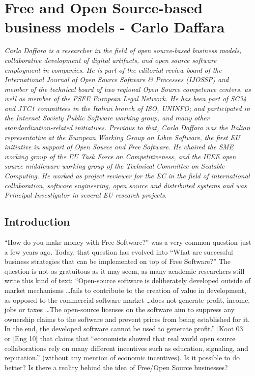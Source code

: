 \chapter{Free and Open Source-based business models - Carlo Daffara}

\textit{Carlo Daffara is a researcher in the field of open source-based business
models, collaborative development of digital artifacts, and open source software
employment in companies. He is part of the editorial review board of the
International Journal of Open Source Software \& Processes (IJOSSP) and member
of the technical board of two regional Open Source competence centers, as well
as member of the FSFE European Legal Network. He has been part of SC34 and JTC1
committees in the Italian branch of ISO, UNINFO; and participated in the
Internet Society Public Software working group, and many other
standardization-related initiatives. Previous to that, Carlo Daffara was the
Italian representative at the European Working Group on Libre Software, the
first EU initiative in support of Open Source and Free Software. He chaired the
SME working group of the EU Task Force on Competitiveness, and the IEEE open
source middleware working group of the Technical Committee on Scalable Computing. He worked as project reviewer for the EC in the field of international collaboration, software engineering, open source and distributed systems and was Principal Investigator in several EU research projects.}

\section*{Introduction}

``How do you make money with Free Software?'' was a very common question just a
few years ago. Today, that question has evolved into ``What are successful
business strategies that can be implemented on top of Free Software?'' The
question is not as gratuitous as it may seem, as many academic researchers still
write this kind of text: ``Open-source software is deliberately developed outside of market mechanisms \dots fails to contribute to the creation of value in development, as opposed to the commercial software market \dots does not generate profit, income, jobs or taxes \dots The open-source licenses on the software aim to suppress any ownership claims to the software and prevent prices from being established for it. In the end, the developed software cannot be used to generate profit.'' [Koot 03] or [Eng 10] that claims that ``economists showed that real world open source collaborations rely on many different incentives such as education, signaling, and reputation.'' (without any mention of economic
incentives). Is it possible to do better? Is there a reality behind the idea of
Free/Open Source businesses?

